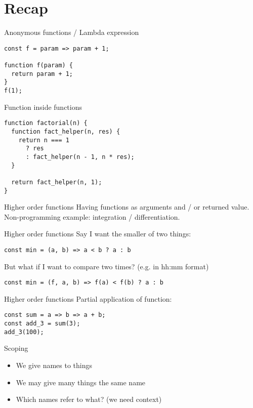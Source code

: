 \documentclass[10pt]{beamer}
\begin{document}
\section[Recap]{Recap}

\begin{frame}[fragile]{Anonymous functions / Lambda expression}
  \begin{verbatim}
const f = param => param + 1;

function f(param) {
  return param + 1;
}
f(1);
  \end{verbatim}
\end{frame}

\begin{frame}[fragile]{Function inside functions}
  \begin{verbatim}
function factorial(n) {
  function fact_helper(n, res) {
    return n === 1
      ? res
      : fact_helper(n - 1, n * res);
  }

  return fact_helper(n, 1);
}
  \end{verbatim}
\end{frame}

\begin{frame}[fragile]{Higher order functions}
  Having functions as arguments and / or returned value. \\
  Non-programming example: integration / differentiation.
\end{frame}

\begin{frame}[fragile]{Higher order functions}
  Say I want the smaller of two things:
  \begin{verbatim}
const min = (a, b) => a < b ? a : b
  \end{verbatim}
  But what if I want to compare two times? (e.g. in hh:mm format)
  \begin{verbatim}
const min = (f, a, b) => f(a) < f(b) ? a : b
  \end{verbatim} 
\end{frame}

\begin{frame}[fragile]{Higher order functions}
  Partial application of function:
  \begin{verbatim}
const sum = a => b => a + b;
const add_3 = sum(3);
add_3(100);
  \end{verbatim}
\end{frame}

\begin{frame}[fragile]{Scoping}
  \begin{itemize}
    \item We give names to things
    \item We may give many things the same name
    \item Which names refer to what? (we need context)
  \end{itemize}  
\end{frame}
\end{document}
